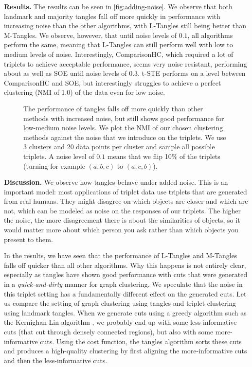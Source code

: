 \noindent
\textbf{Results.}
The results can be seen in \autoref{fig:adding-noise}.
We observe that both landmark and majority tangles fall off more quickly in performance with increasing noise 
than the other algorithms, with L-Tangles still being better than M-Tangles. 
We observe, however, that until noise levels of $0.1$, all algorithms perform the same, meaning that L-Tangles can still perform well with low to medium levels of noise. Interestingly, ComparisonHC, which 
required a lot of triplets to achieve acceptable performance, seems 
very noise resistant, performing about as well as SOE until noise levels of 0.3. t-STE performs on a level between ComparisonHC and SOE, but interestingly struggles to achieve a perfect clustering 
(NMI of 1.0) of the data even for low noise. 

\begin{figure}[ht]
    \centering
    \resizebox{0.7\textwidth}{!}{}
    \caption{
        The performance of tangles falls off more quickly than other methods with increased noise, but still shows good performance for low-medium noise levels.
        We plot the NMI of our chosen clustering methods against the noise that we introduce on 
        the triplets.
        We use $3$ clusters and $20$ data points per cluster and sample all possible triplets. A noise level of $0.1$ means that we flip 10\% of the triplets (turning for example $(a,b,c)$ to $(a,c,b)$). 
    }
    \label{fig:adding-noise}
\end{figure}

\noindent
\textbf{Discussion.}
We observe how tangles behave under added noise. This is an important model: most applications of triplet data use triplets that are generated from
real humans. They might disagree on which objects are closer and which are not, which can be modeled as noise on the responses of our triplets. The higher the noise, 
the more disagreement there is about the similarities of objects, so it would matter more about which person you ask rather than which objects you present to them. 

In the results, we have seen that the performance of L-Tangles and M-Tangles falls off quicker than all other algorithms. Why this happens is not entirely clear, especially 
as tangles have shown good performance with cuts that were generated in a \textit{quick-and-dirty} manner for graph clustering.
We speculate that the noise in this triplet setting has a fundamentally different effect on the generated cuts. Let us compare the setting of
graph clustering using tangles and triplet clustering using landmark tangles. When we generate cuts using a greedy algorithm such as the Kernighan-Lin algorithm \citep{kernighanbrianwilsonEfficientHeuristicProcedure1970}, we probably end up with some less-informative cuts (that cut through densely connected regions), but also with some more-informative cuts. 
Using the cost function, the tangles algorithm sorts these cuts and produces a high-quality clustering by first aligning the more-informative cuts and then the less-informative cuts. 

